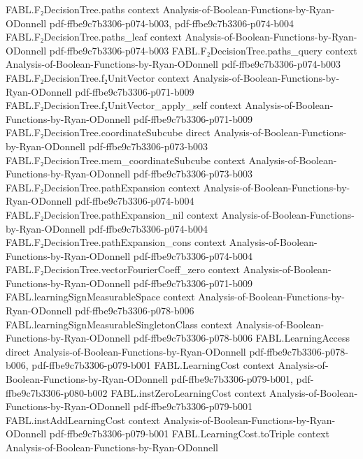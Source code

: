 \begin{theorem}
\proofstep
  {FABL.F₂DecisionTree.paths}
  {context}
  {Analysis-of-Boolean-Functions-by-Ryan-ODonnell}
  {pdf-ffbe9c7b3306-p074-b003,
    pdf-ffbe9c7b3306-p074-b004}
\proofstep
  {FABL.F₂DecisionTree.paths_leaf}
  {context}
  {Analysis-of-Boolean-Functions-by-Ryan-ODonnell}
  {pdf-ffbe9c7b3306-p074-b003}
\proofstep
  {FABL.F₂DecisionTree.paths_query}
  {context}
  {Analysis-of-Boolean-Functions-by-Ryan-ODonnell}
  {pdf-ffbe9c7b3306-p074-b003}
\proofstep
  {FABL.F₂DecisionTree.f₂UnitVector}
  {context}
  {Analysis-of-Boolean-Functions-by-Ryan-ODonnell}
  {pdf-ffbe9c7b3306-p071-b009}
\proofstep
  {FABL.F₂DecisionTree.f₂UnitVector_apply_self}
  {context}
  {Analysis-of-Boolean-Functions-by-Ryan-ODonnell}
  {pdf-ffbe9c7b3306-p071-b009}
\proofstep
  {FABL.F₂DecisionTree.coordinateSubcube}
  {direct}
  {Analysis-of-Boolean-Functions-by-Ryan-ODonnell}
  {pdf-ffbe9c7b3306-p073-b003}
\proofstep
  {FABL.F₂DecisionTree.mem_coordinateSubcube}
  {context}
  {Analysis-of-Boolean-Functions-by-Ryan-ODonnell}
  {pdf-ffbe9c7b3306-p073-b003}
\proofstep
  {FABL.F₂DecisionTree.pathExpansion}
  {context}
  {Analysis-of-Boolean-Functions-by-Ryan-ODonnell}
  {pdf-ffbe9c7b3306-p074-b004}
\proofstep
  {FABL.F₂DecisionTree.pathExpansion_nil}
  {context}
  {Analysis-of-Boolean-Functions-by-Ryan-ODonnell}
  {pdf-ffbe9c7b3306-p074-b004}
\proofstep
  {FABL.F₂DecisionTree.pathExpansion_cons}
  {context}
  {Analysis-of-Boolean-Functions-by-Ryan-ODonnell}
  {pdf-ffbe9c7b3306-p074-b004}
\proofstep
  {FABL.F₂DecisionTree.vectorFourierCoeff_zero}
  {context}
  {Analysis-of-Boolean-Functions-by-Ryan-ODonnell}
  {pdf-ffbe9c7b3306-p071-b009}
\proofstep
  {FABL.learningSignMeasurableSpace}
  {context}
  {Analysis-of-Boolean-Functions-by-Ryan-ODonnell}
  {pdf-ffbe9c7b3306-p078-b006}
\proofstep
  {FABL.learningSignMeasurableSingletonClass}
  {context}
  {Analysis-of-Boolean-Functions-by-Ryan-ODonnell}
  {pdf-ffbe9c7b3306-p078-b006}
\proofstep
  {FABL.LearningAccess}
  {direct}
  {Analysis-of-Boolean-Functions-by-Ryan-ODonnell}
  {pdf-ffbe9c7b3306-p078-b006,
    pdf-ffbe9c7b3306-p079-b001}
\proofstep
  {FABL.LearningCost}
  {context}
  {Analysis-of-Boolean-Functions-by-Ryan-ODonnell}
  {pdf-ffbe9c7b3306-p079-b001,
    pdf-ffbe9c7b3306-p080-b002}
\proofstep
  {FABL.instZeroLearningCost}
  {context}
  {Analysis-of-Boolean-Functions-by-Ryan-ODonnell}
  {pdf-ffbe9c7b3306-p079-b001}
\proofstep
  {FABL.instAddLearningCost}
  {context}
  {Analysis-of-Boolean-Functions-by-Ryan-ODonnell}
  {pdf-ffbe9c7b3306-p079-b001}
\proofstep
  {FABL.LearningCost.toTriple}
  {context}
  {Analysis-of-Boolean-Functions-by-Ryan-ODonnell}

\end{theorem}
